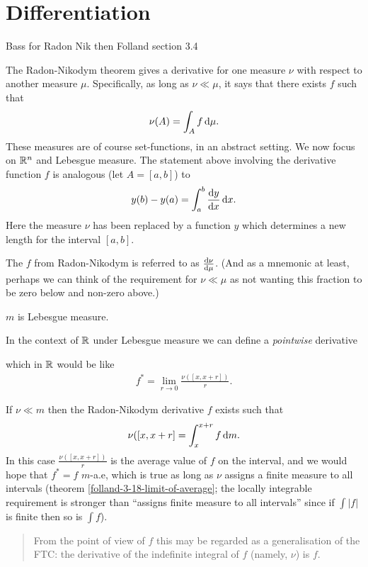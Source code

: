 \section{Differentiation}

Bass for Radon Nik then
Folland section 3.4

The Radon-Nikodym theorem gives a derivative for one measure $\nu$ with respect to another measure $\mu$.
Specifically, as long as $\nu \ll \mu$, it says that there exists $f$ such that
\begin{align*}
  \nu(A) = \int_A f \dmu.
\end{align*}
These measures are of course set-functions, in an abstract setting. We now focus on $\mathbb{R}^n$ and Lebesgue
measure. The statement above involving the derivative function $f$ is analogous (let $A = [a, b]$) to
\begin{align*}
  y(b) - y(a) = \int_a^b \dydx \dx.
\end{align*}
Here the measure $\nu$ has been replaced by a function $y$ which determines a new length for the
interval $[a, b]$.

The $f$ from Radon-Nikodym is referred to as $\frac{\d\nu}{\dmu}$. (And as a mnemonic at least, perhaps we can
think of the requirement for $\nu \ll \mu$ as not wanting this fraction to be zero below and non-zero above.)

$m$ is Lebesgue measure.

In the context of $\mathbb{R}$ under Lebesgue measure we can define a {\it pointwise} derivative

which in $\mathbb{R}$ would be like
\begin{align*}
  f^* = \lim_{r \to 0}\frac{\nu([x,x + r])}{r}.
\end{align*}

If $\nu \ll m$ then the Radon-Nikodym derivative $f$ exists such that
\begin{align*}
  \nu([x,x + r] = \int_{x}^{x+r} f \dm.
\end{align*}
In this case $\frac{\nu([x,x + r])}{r}$ is the average value of $f$ on the interval, and we would hope
that $f^* = f$ $m$-a.e, which is true as long as $\nu$ assigns a finite measure to all intervals (theorem
\ref{folland-3-18-limit-of-average}; the locally integrable requirement is stronger than ``assigns finite
measure to all intervals​'' since if $\int |f|$ is finite then so is $\int f$).

\begin{quote}
  From the point of view of $f$ this may be regarded as a generalisation of the FTC: the derivative of the
  indefinite integral of $f$ (namely, $\nu$) is $f$.
\end{quote}

